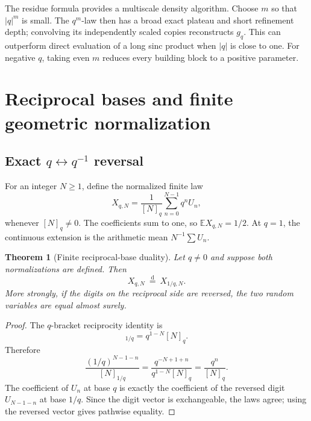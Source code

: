 \documentclass[11pt]{article}
\newtheorem{theorem}{Theorem}[section]
\theoremstyle{definition}
\newcommand{\E}{\mathbb E}
\newcommand{\doteqL}{\mathrel{\stackrel{\mathrm d}=}}
\begin{document}
The residue formula provides a multiscale density algorithm.  Choose \(m\) so that
\(\lvert q\rvert^m\) is small.  The \(q^m\)-law then has a broad exact plateau and short
refinement depth; convolving its independently scaled copies reconstructs \(g_q\).  This
can outperform direct evaluation of a long sinc product when \(\lvert q\rvert\) is close
to one.  For negative \(q\), taking even \(m\) reduces every building block to a positive
parameter.

\section{Reciprocal bases and finite geometric normalization}

\subsection{Exact \texorpdfstring{$q\leftrightarrow q^{-1}$}{q <-> q^-1} reversal}

For an integer \(N\ge1\), define the normalized finite law
\begin{equation}
 X_{q,N}=\frac1{[N]_q}\sum_{n=0}^{N-1}q^nU_n,             \label{eq:finite-Xq}
\end{equation}
whenever \([N]_q\ne0\).  The coefficients sum to one, so \(\E X_{q,N}=1/2\).  At
\(q=1\), the continuous extension is the arithmetic mean \(N^{-1}\sum U_n\).

\begin{theorem}[Finite reciprocal-base duality]\label{thm:reciprocal-duality}
Let \(q\ne0\) and suppose both normalizations are defined.  Then
\begin{equation}
 \boxed{X_{q,N}\ \doteqL\ X_{1/q,N}.}                    \label{eq:reciprocal-law}
\end{equation}
More strongly, if the digits on the reciprocal side are reversed, the two random
variables are equal almost surely.
\end{theorem}

\begin{proof}
The $q$-bracket reciprocity identity is
\begin{equation}
 [N]_{1/q}=q^{1-N}[N]_q.                                  \label{eq:qbracket-reciprocity}
\end{equation}
Therefore
\[
 \frac{(1/q)^{N-1-n}}{[N]_{1/q}}
 =\frac{q^{-N+1+n}}{q^{1-N}[N]_q}
 =\frac{q^n}{[N]_q}.
\]
The coefficient of \(U_n\) at base \(q\) is exactly the coefficient of the reversed digit
\(U_{N-1-n}\) at base \(1/q\).  Since the digit vector is exchangeable, the laws agree;
using the reversed vector gives pathwise equality.
\end{proof}
\end{document}
